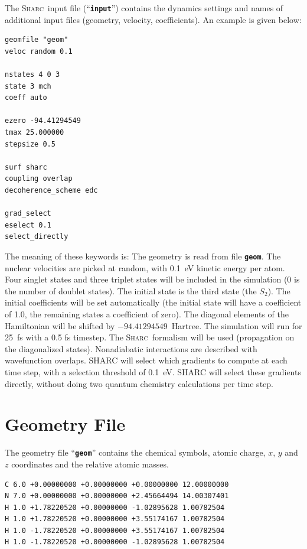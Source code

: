 \documentclass[a4paper,11pt,DIV=15,openany]{scrbook}
\newcommand{\sharc}{\textsc{Sharc}}
\newcommand{\ttt}[1]{\textbf{\texttt{#1}}}
\newenvironment{example}{
  \vspace{0mm}
  \definecolor{shadecolor}{HTML}{E4F4FF}
  \begin{shaded}
}{
  \end{shaded}
}
\begin{document}
The \sharc\ input file (``\ttt{input}'') contains the dynamics settings and names of additional input files (geometry, velocity, coefficients). An example is given below:
\begin{example}\vspace{-8mm}
\begin{verbatim}
geomfile "geom"
veloc random 0.1

nstates 4 0 3
state 3 mch
coeff auto

ezero -94.41294549
tmax 25.000000
stepsize 0.5

surf sharc
coupling overlap
decoherence_scheme edc

grad_select
eselect 0.1
select_directly
\end{verbatim}\vspace{-5mm}
\end{example}

The meaning of these keywords is: The geometry is read from file \ttt{geom}. 
The nuclear velocities are picked at random, with 0.1~eV kinetic energy per atom. 
Four singlet states and three triplet states will be included in the simulation (0 is the number of doublet states). 
The initial state is the third state (the $S_2$). 
The initial coefficients will be set automatically (the initial state will have a coefficient of 1.0, the remaining states a coefficient of zero). 
The diagonal elements of the Hamiltonian will be shifted by $-94.41294549$~Hartree. 
The simulation will run for 25~fs with a 0.5 fs timestep. 
The \sharc\ formalism will be used (propagation on the diagonalized states). 
Nonadiabatic interactions are described with wavefunction overlaps.
SHARC will select which gradients to compute at each time step, with a selection threshold of 0.1~eV.
SHARC will select these gradients directly, without doing two quantum chemistry calculations per time step.

\section{Geometry File}

The geometry file ``\ttt{geom}'' contains the chemical symbols, atomic charge, $x$, $y$ and $z$ coordinates and the relative atomic masses.

\begin{example}\vspace{-8mm}
\begin{verbatim}
C 6.0 +0.00000000 +0.00000000 +0.00000000 12.00000000
N 7.0 +0.00000000 +0.00000000 +2.45664494 14.00307401
H 1.0 +1.78220520 +0.00000000 -1.02895628 1.00782504
H 1.0 +1.78220520 +0.00000000 +3.55174167 1.00782504
H 1.0 -1.78220520 +0.00000000 +3.55174167 1.00782504
H 1.0 -1.78220520 +0.00000000 -1.02895628 1.00782504
\end{verbatim}\vspace{-5mm}
\end{example}
\end{document}
